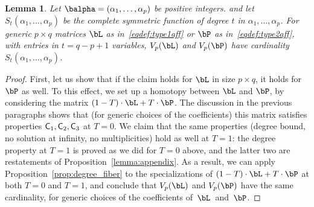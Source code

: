 \documentclass[12pt]{article}
\newtheorem{lemma}[definition]{Lemma}
\begin{document}
\begin{lemma}
  Let $\balpha=(\alpha_1,\dots,\alpha_p)$ be positive integers.  and
  let $S_{t}(\alpha_1,\dots,\alpha_p)$ be the complete symmetric
  function of degree $t$ in $\alpha_1,\dots,\alpha_p$. For generic $p
  \times q$ matrices $\bL$ as in~\eqref{eqdef:type1aff} or $\bP$ as
  in~\eqref{eqdef:type2aff}, with entries in $t=q-p+1$ variables,
$V_p(\bL)$ and $V_p(\bP)$ have
  cardinality $S_{t}(\alpha_1,\dots,\alpha_p)$.
\end{lemma}
\begin{proof}
  First, let us show that if the claim holds for $\bL$ in size $p
  \times q$, it holds for $\bP$ as well. To this effect, we set up a
  homotopy between $\bL$ and $\bP$, by considering the matrix
  $(1-T)\cdot\bL + T\cdot\bP$.  The discussion in the previous
  paragraphs shows that (for generic choices of the coefficients) this
  matrix satisfies properties $\mathsf{C}_1,\mathsf{C}_2,\mathsf{C}_3$ at $T=0$.  We claim
  that the same properties (degree bound, no solution at infinity, no
  multiplicities) hold as well at $T=1$: the degree property at $T=1$
  is proved as we did for $T=0$ above, and the latter two are
  restatements of Proposition~\ref{lemma:appendix}. As a result, we
  can apply Proposition~\ref{prop:degree_fiber} to the specializations
  of $(1-T)\cdot\bL + T\cdot\bP$ at both $T=0$ and $T=1$, and conclude
  that $V_p(\bL)$ and $V_p(\bP)$ have the same cardinality, for
  generic choices of the coefficients of~$\bL$~and~$\bP$.


\end{proof}
\end{document}
